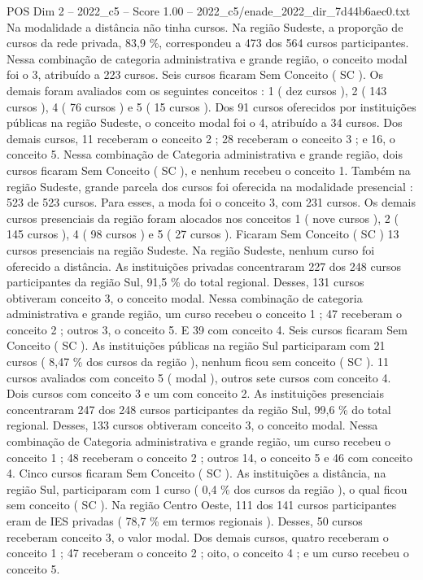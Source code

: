 \begin{textsample}{POS Dim 2 – 2022\_c5 – Score 1.00 – 2022\_c5/enade\_2022\_dir\_7d44b6aec0.txt}
Na modalidade a distância não tinha cursos.
Na região Sudeste, a proporção de cursos da rede privada, 83,9 \%, correspondeu a 473 dos 564 cursos participantes.
Nessa combinação de categoria administrativa e grande região, o conceito modal foi o 3, atribuído a 223 cursos.
Seis cursos ficaram Sem Conceito ( SC ).
Os demais foram avaliados com os seguintes conceitos : 1 ( dez cursos ), 2 ( 143 cursos ), 4 ( 76 cursos ) e 5 ( 15 cursos ).
Dos 91 cursos oferecidos por instituições públicas na região Sudeste, o conceito modal foi o 4, atribuído a 34 cursos.
Dos demais cursos, 11 receberam o conceito 2 ; 28 receberam o conceito 3 ; e 16, o conceito 5.
Nessa combinação de Categoria administrativa e grande região, dois cursos ficaram Sem Conceito ( SC ), e nenhum recebeu o conceito 1.
Também na região Sudeste, grande parcela dos cursos foi oferecida na modalidade presencial : 523 de 523 cursos.
Para esses, a moda foi o conceito 3, com 231 cursos.
Os demais cursos presenciais da região foram alocados nos conceitos 1 ( nove cursos ), 2 ( 145 cursos ), 4 ( 98 cursos ) e 5 ( 27 cursos ).
Ficaram Sem Conceito ( SC ) 13 cursos presenciais na região Sudeste.
Na região Sudeste, nenhum curso foi oferecido a distância.
As instituições privadas concentraram 227 dos 248 cursos participantes da região Sul, 91,5 \% do total regional.
Desses, 131 cursos obtiveram conceito 3, o conceito modal.
Nessa combinação de categoria administrativa e grande região, um curso recebeu o conceito 1 ; 47 receberam o conceito 2 ; outros 3, o conceito 5.
E 39 com conceito 4.
Seis cursos ficaram Sem Conceito ( SC ).
As instituições públicas na região Sul participaram com 21 cursos ( 8,47 \% dos cursos da região ), nenhum ficou sem conceito ( SC ). 11 cursos avaliados com conceito 5 ( modal ), outros sete cursos com conceito 4.
Dois cursos com conceito 3 e um com conceito 2.
As instituições presenciais concentraram 247 dos 248 cursos participantes da região Sul, 99,6 \% do total regional.
Desses, 133 cursos obtiveram conceito 3, o conceito modal.
Nessa combinação de Categoria administrativa e grande região, um curso recebeu o conceito 1 ; 48 receberam o conceito 2 ; outros 14, o conceito 5 e 46 com conceito 4.
Cinco cursos ficaram Sem Conceito ( SC ).
As instituições a distância, na região Sul, participaram com 1 curso ( 0,4 \% dos cursos da região ), o qual ficou sem conceito ( SC ).
Na região Centro Oeste, 111 dos 141 cursos participantes eram de IES privadas ( 78,7 \% em termos regionais ).
Desses, 50 cursos receberam conceito 3, o valor modal.
Dos demais cursos, quatro receberam o conceito 1 ; 47 receberam o conceito 2 ; oito, o conceito 4 ; e um curso recebeu o conceito 5.

\end{textsample}

